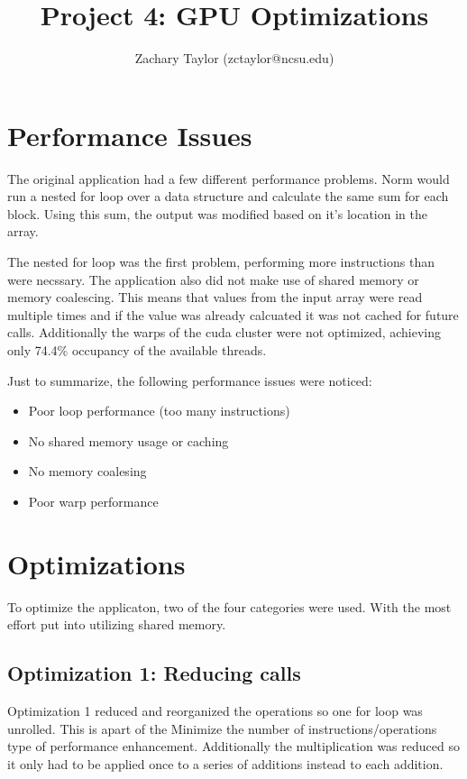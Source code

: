 \documentclass{article}
\title{Project 4: GPU Optimizations}
\author{Zachary Taylor (zctaylor@ncsu.edu)}
\begin{document}
\maketitle

\section{Performance Issues}
The original application had a few different performance problems. Norm would
run a nested for loop over a data structure and calculate the same sum for each
block. Using this sum, the output was modified based on it's location in the
array. \par
The nested for loop was the first problem, performing more instructions than
were necssary. The application also did not make use of shared memory or memory
coalescing. This means that values from the input array were read multiple times
and if the value was already calcuated it was not cached for future calls.
Additionally the warps of the cuda cluster were not optimized, achieving only
74.4\% occupancy of the available threads. \par
Just to summarize, the following performance issues were noticed: \par

\begin{itemize}
\item Poor loop performance (too many instructions)
\item No shared memory usage or caching
\item No memory coalesing
\item Poor warp performance
\end{itemize}
  
\section{Optimizations}
To optimize the applicaton, two of the four categories were used. With the most
effort put into utilizing shared memory.

  \subsection{Optimization 1: Reducing calls}
  Optimization 1 reduced and reorganized the operations so one for loop was
  unrolled. This is apart of the Minimize the number of instructions/operations
  type of performance enhancement.  Additionally the multiplication was reduced
  so it only had to be applied once to a series of additions instead to each addition.
\end{document}
